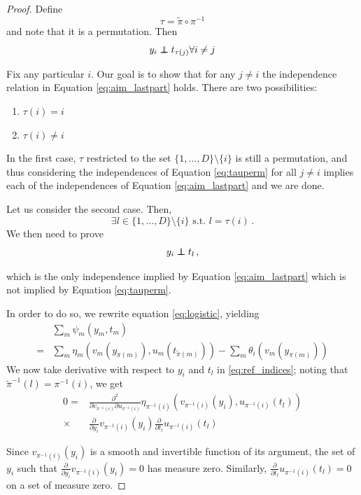 \documentclass[letterpaper]{article}
\newcommand\independent{\protect\mathpalette{\protect\independenT}{\perp}}
\def\independenT#1#2{\mathrel{\rlap{$#1#2$}\mkern2mu{#1#2}}}
\theoremstyle{definition}
\begin{document}
\begin{proof}
Define
\[
\tau = \tilde{\pi} \circ \pi^{-1}
\]
and note that it is a permutation. Then
\begin{equation}
    y_i \independent t_{\tau(j)}  \forall i \neq j \label{eq:tauperm}
\end{equation}

Fix any particular $i$.
Our goal is to show that for any $j\not= i$ the independence relation in Equation \ref{eq:aim_lastpart} holds.
There are two possibilities:
\begin{enumerate}[i]
\item $\tau(i)=i$
\item $\tau(i)\neq i$
\end{enumerate}
In the first case, $\tau$ restricted to the set $\{1,\ldots,D\}\setminus\{i\}$ is still a permutation, and thus considering the independences of Equation \ref{eq:tauperm} for all $j\not= i$ implies each of the independences of Equation \ref{eq:aim_lastpart} and we are done.

Let us consider the second case. Then,
\[
\exists l \in \{1, \ldots, D \}\setminus\{i\}\,\, \text{s.t.} \,\, l = \tau(i)\,.
\]
We then need to prove
\begin{equation}
y_i \independent t_l\,, \label{eq:ref_indices}
\end{equation}

which is the only independence implied by Equation \ref{eq:aim_lastpart} which is not implied by Equation \ref{eq:tauperm}.

In order to do so, we rewrite equation \ref{eq:logistic}, yielding
\begin{align}
&\sum_{m}\psi_{m}(y_{m},t_{m}) \nonumber \\
=&\sum_{m}\eta_{m}(v_m(y_{\pi(m)}), u_m(t_{\tilde{\pi}(m)}))
-\sum_{m}\theta_{i}(v_m(y_{\pi(m)}))
\end{align}
We now take derivative with respect to $y_i$ and $t_l$ in \ref{eq:ref_indices}; noting that $\tilde{\pi}^{-1}(l) = \pi^{-1}(i) $, we get
\begin{align}
    0 = & \frac{\partial^2}{\partial v_{\pi^{-1}(i)} \partial u_{\pi^{-1}(i)}} \eta_{\pi^{-1}(i)}(v_{\pi^{-1}(i)}(y_i), u_{\pi^{-1}(i)}(t_l)) \nonumber \\
    \times & \frac{\partial}{\partial y_i}v_{\pi^{-1}(i)}(y_i) \frac{\partial }{\partial t_l} u_{\pi^{-1}(i)}(t_l) \label{eq:perm_deriv}
\end{align}

Since $v_{\pi^{-1}(i)}(y_i)$ is a smooth and invertible function of its argument, the set of $y_i$ such that $\frac{\partial}{\partial y_i}v_{\pi^{-1}(i)}(y_i) = 0$ has measure zero.
Similarly, $\frac{\partial }{\partial t_l} u_{\pi^{-1}(i)}(t_l) = 0$ on a set of measure zero.


\end{proof}
\end{document}
